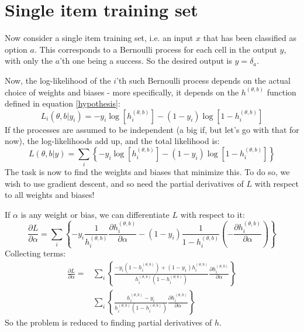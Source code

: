 \documentclass[12pt, a4paper]{article}
\numberwithin{equation}{section}
\begin{document}
\section{Single item training set}
Now consider a single item training set, i.e. an input $x$ that has been classified as option $a$. This corresponds to a Bernoulli process for each cell in the output $y$, with only the $a$'th one being a success. So the desired output is $y=\delta_a$.

Now, the log-likelihood of the $i$'th such Bernoulli process depends on the actual choice of weights and biases - more specifically, it depends on the $h^{(\theta,b)}$ function defined in equation \ref{hypothesis}:
\begin{equation}
L_i(\theta,b|y_i)=-y_i\log\left[h^{(\theta,b)}_i\right]-(1-y_i)\log\left[1-h^{(\theta,b)}_i\right]
\end{equation}
If the processes are assumed to be independent (a big if, but let's go with that for now), the log-likelihoods add up, and the total likelihood is:
\begin{equation}
L(\theta,b|y)=\sum_i\left\{-y_i\log\left[h^{(\theta,b)}_i\right]-(1-y_i)\log\left[1-h^{(\theta,b)}_i\right]\right\}
\end{equation}
The task is now to find the weights and biases that minimize this. To do so, we wish to use gradient descent, and so need the partial derivatives of $L$ with respect to all weights and biases!

If $\alpha$ is any weight or bias, we can differentiate $L$ with respect to it:
\begin{equation}
\frac{\partial L}{\partial\alpha}=\sum_i\left\{-y_i\frac{1}{h^{(\theta,b)}_i}\frac{\partial h^{(\theta,b)}_i}{\partial\alpha}-(1-y_i)\frac{1}{1-h^{(\theta,b)}_i}\left(-\frac{\partial h^{(\theta,b)}_i}{\partial\alpha}\right)\right\}
\end{equation}
Collecting terms:
\begin{align}
\frac{\partial L}{\partial\alpha}=&\sum_i\left\{\frac{-y_i\left(1-h^{(\theta,b)}_i\right)+(1-y_1)h^{(\theta,b)}_i}{h^{(\theta,b)}_i(1-h^{(\theta,b)}_i)}\frac{\partial h^{(\theta,b)}_i}{\partial\alpha}\right\}\\
&\sum_i\left\{\frac{h^{(\theta,b)}_i-y_i}{h^{(\theta,b)}_i\left(1-h^{(\theta,b)}_i\right)}\frac{\partial h^{(\theta,b)}_i}{\partial\alpha}\right\}
\label{general_partial_formula}
\end{align}
So the problem is reduced to finding partial derivatives of $h$.
\end{document}
